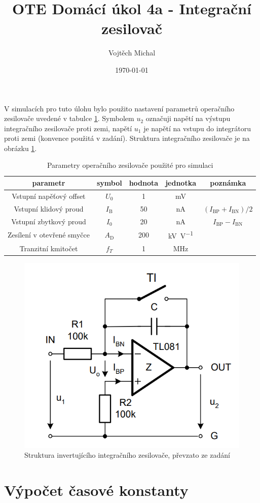 \documentclass[twoside]{article}
\title{OTE Domácí úkol 4a - Integrační zesilovač}
\author{Vojtěch Michal}
\date{\today}
\begin{document}
\maketitle

V simulacích pro tuto úlohu bylo použito nastavení parametrů operačního zesilovače uvedené v tabulce \ref{tab:oz_param}.
Symbolem $u_2$ označuji napětí na výstupu integračního zesilovače proti zemi,
napětí $u_1$ je napětí na vstupu do integrátoru proti zemi
(konvence použitá v zadání). Struktura integračního zesilovače je na obrázku \ref{fig:int_amp}.

\begin{table}[h!]
    \centering
    \begin{tabular}{c|c|c|c|c}
        parametr & symbol & hodnota & jednotka & poznámka\\
        \hline
        Vstupní napěťový offset & $U_0$ & 1 & \si{\milli\volt} & \\
        Vstupní klidový proud & $I_\text{B}$ & 50 & \si{\nano\ampere} & $(I_\text{BP} + I_\text{BN})/2$ \\
        Vstupní zbytkový proud & $I_0$ & 20 & \si{\nano\ampere} & $I_\text{BP} - I_\text{BN}$ \\
        Zesílení v otevřené smyčce & $A_\text{D}$ & 200 & \si{\kilo\volt\per\volt} & \\
        Tranzitní kmitočet& $f_T$ & 1 & \si{\mega\hertz} &
    \end{tabular}
    \caption{Parametry operačního zesilovače použité pro simulaci}
    \label{tab:oz_param}
\end{table}

\begin{figure}[h!]
    \centering
    \includegraphics[width=0.5\linewidth]{int_amp.png}
    \caption{Struktura invertujícího integračního zesilovače, převzato ze zadání}
    \label{fig:int_amp}
\end{figure}


\section{Výpočet časové konstanty}
\end{document}
